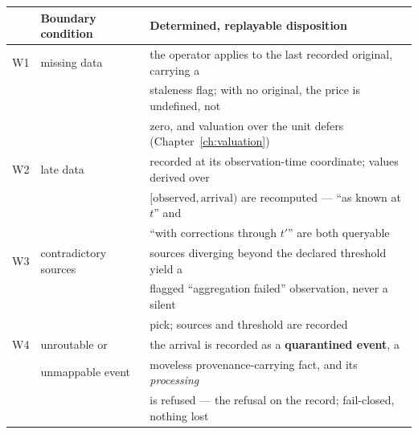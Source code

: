 \documentclass[11pt,a4paper]{article}
\begin{document}
\begin{center}
\begin{tabular}{@{}lll@{}}
\toprule
 & Boundary condition & Determined, replayable disposition \\
\midrule
W1 & missing data & the operator applies to the last recorded original, carrying a \\
   &               & staleness flag; with no original, the price is undefined, not \\
   &               & zero, and valuation over the unit defers (Chapter~\ref{ch:valuation}) \\
W2 & late data & recorded at its observation-time coordinate; values derived over \\
   &            & $[\text{observed},\text{arrival})$ are recomputed --- ``as known at $t$'' and \\
   &            & ``with corrections through $t'$'' are both queryable \\
W3 & contradictory sources & sources diverging beyond the declared threshold yield a \\
   &                       & flagged ``aggregation failed'' observation, never a silent \\
   &                       & pick; sources and threshold are recorded \\
W4 & unroutable or & the arrival is recorded as a \textbf{quarantined event}, a \\
   & unmappable event & moveless provenance-carrying fact, and its \emph{processing} \\
   &                  & is refused --- the refusal on the record; fail-closed, nothing lost \\
\bottomrule
\end{tabular}
\end{center}
\end{document}
